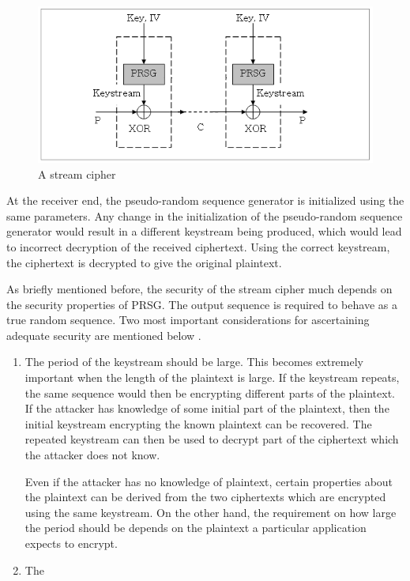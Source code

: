 \begin{figure}[ht!]
	\centering
		\includegraphics[width=4.5in]{./figures/stream-cipher.PNG}
	\caption{A stream cipher}	
	\label{fig:stream-cipher}
\end{figure}

At the receiver end, the pseudo-random sequence generator is initialized using the same parameters. Any change in the initialization of the pseudo-random sequence generator would result in a different keystream being produced, which would lead to incorrect decryption of the received ciphertext. Using the correct keystream, the ciphertext is decrypted to give the original plaintext. 

As briefly mentioned before, the security of the stream cipher much depends on the security properties of PRSG. The output sequence is required to behave as a true random sequence. Two most important considerations for ascertaining adequate security are mentioned below \cite{robshaw1995sct}.
\begin{enumerate}
\item The period of the keystream should be large. This becomes extremely important when the length of the plaintext is large. If the keystream repeats, the same sequence would then be encrypting different parts of the plaintext. If the attacker has knowledge of some initial part of the plaintext, then the initial keystream encrypting the known plaintext can be recovered. The repeated keystream can then be used to decrypt part of the ciphertext which the attacker does not know. 

Even if the attacker has no knowledge of plaintext, certain properties about the plaintext can be derived from the two ciphertexts which are encrypted using the same keystream. On the other hand, the requirement on how large the period should be depends on the plaintext a particular application expects to encrypt.

\item The 
\end{enumerate}

